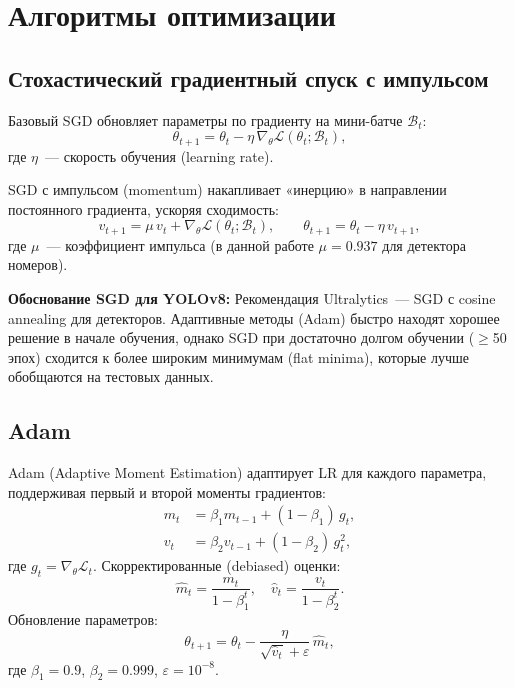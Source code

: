 \documentclass[14pt,a4paper]{report}
\numberwithin{equation}{chapter}
\numberwithin{figure}{chapter}
\numberwithin{table}{chapter}
\begin{document}
\section{Алгоритмы оптимизации}

\subsection{Стохастический градиентный спуск с импульсом}

Базовый SGD обновляет параметры по градиенту на мини-батче
$\mathcal{B}_t$:
\begin{equation}
  \theta_{t+1} = \theta_t -
    \eta\,\nabla_\theta\mathcal{L}(\theta_t;\mathcal{B}_t),
\end{equation}
где $\eta$~--- скорость обучения (learning rate).

SGD с импульсом (momentum) накапливает «инерцию» в направлении
постоянного градиента, ускоряя сходимость:
\begin{equation}
  v_{t+1} = \mu\,v_t +
    \nabla_\theta\mathcal{L}(\theta_t;\mathcal{B}_t),
  \qquad
  \theta_{t+1} = \theta_t - \eta\,v_{t+1},
\end{equation}
где $\mu$~--- коэффициент импульса (в данной работе $\mu=0.937$
для детектора номеров).

\textbf{Обоснование SGD для YOLOv8:}
Рекомендация Ultralytics~--- SGD с cosine annealing для детекторов.
Адаптивные методы (Adam) быстро находят хорошее решение в начале
обучения, однако SGD при достаточно долгом обучении ($\geq$50 эпох)
сходится к более широким минимумам (flat minima), которые лучше
обобщаются на тестовых данных.

\subsection{Adam}

Adam (Adaptive Moment Estimation) адаптирует LR для каждого
параметра, поддерживая первый и второй моменты градиентов:
\begin{align}
  m_t &= \beta_1 m_{t-1} + (1-\beta_1)\,g_t, \\
  v_t &= \beta_2 v_{t-1} + (1-\beta_2)\,g_t^2,
\end{align}
где $g_t = \nabla_\theta\mathcal{L}_t$.
Скорректированные (debiased) оценки:
\begin{equation}
  \hat{m}_t = \frac{m_t}{1-\beta_1^t},\quad
  \hat{v}_t = \frac{v_t}{1-\beta_2^t}.
\end{equation}
Обновление параметров:
\begin{equation}
  \theta_{t+1} = \theta_t -
    \frac{\eta}{\sqrt{\hat{v}_t}+\varepsilon}\,\hat{m}_t,
\end{equation}
где $\beta_1=0.9$, $\beta_2=0.999$, $\varepsilon=10^{-8}$.
\end{document}

